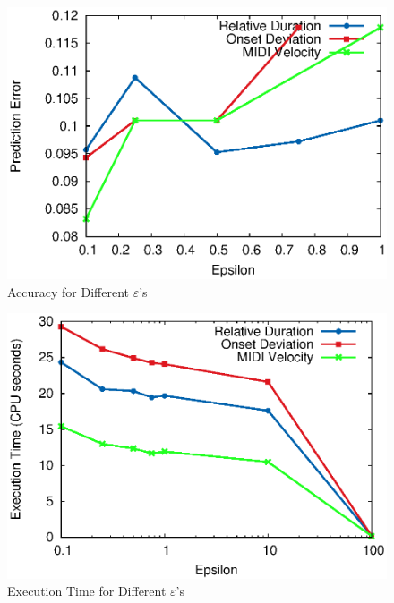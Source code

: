 \begin{figure}[tp]
   \begin{center}
      \includegraphics[width=\textwidth]{fig/eps_accu.eps}

   \end{center}
   \caption{Accuracy for Different $\varepsilon$'s}
   \label{fig:eps_accu}
\end{figure}
\begin{figure}[tp]
   \begin{center}
      \includegraphics[width=\textwidth]{fig/eps_time.eps}

   \end{center}
   \caption{Execution Time for Different $\varepsilon$'s}
   \label{fig:eps_time}
\end{figure}

